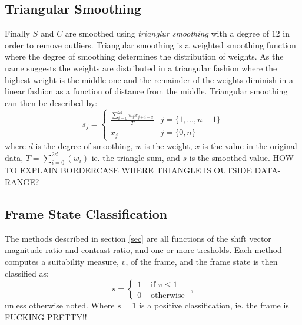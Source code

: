 \subsection{Triangular Smoothing}
%
%
%
%
%
Finally $S$ and $C$ are smoothed using \textit{trianglur smoothing} with a degree of $12$ in order to remove outliers. Triangular smoothing is a weighted smoothing function where the degree of smoothing determines the distribution of weights. As the name suggests the weights are distributed in a triangular fashion where the highest weight is the middle one and the remainder of the weights diminish in a linear fashion as a function of distance from the middle. Triangular smoothing can then be described by:
%
\[
s_{j} = 
\begin{cases}
\frac{\sum_{i=0}^{2d} w_{i}x_{j+i-d}}{T} & j=\{1,\dots,n-1\}\\
x_{j} & j=\{0,n\}
\end{cases}
\]
%
where $d$ is the degree of smoothing, $w$ is the weight, $x$ is the value in the original data, $T = \sum_{i=0}^{2d}(w_{i})$ ie. the triangle sum, and $s$ is the smoothed value. HOW TO EXPLAIN BORDERCASE WHERE TRIANGLE IS OUTSIDE DATA-RANGE? %
%
\subsection{Frame State Classification}
%
The methods described in section \ref{sec} are all functions of the shift vector magnitude ratio and contrast ratio, and one or more tresholds. Each method computes a suitability measure, $v$, of the frame, and the frame state is then classified as:
\[
s = 
\begin{cases}
1 & \text{ if } v \leq 1\\
0 & \text{ otherwise }
\end{cases},
\]
unless otherwise noted. Where $s=1$ is a positive classification, ie. the frame is FUCKING PRETTY!!
